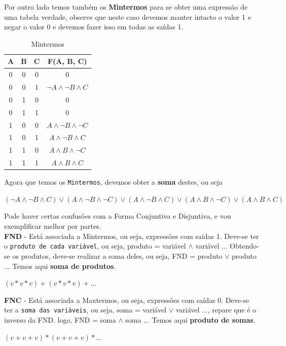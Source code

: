 \documentclass[12pt, onecolumn]{article}
\begin{document}
	Por outro lado temos também os \textbf{Mintermos} para se obter 
	uma expressão de uma tabela verdade, observe que neste caso
	devemos manter intacto o valor 1 e negar o valor 0 e devemos fazer isso
	em todas as saídas 1. \\
        \begin{table}[ht]
                \centering
                \begin{tabular}{|c|c|c|c|}
                        \hline
                        A & B & C & F(A, B, C)\\ \hline

                        0 & 0 & 0 & 0 \\ \hline
			0 & 0 & 1 & $\lnot{A} \land \lnot{B} \land C$ \\ \hline %
                        0 & 1 & 0 & 0 \\ \hline
                        0 & 1 & 1 & 0 \\ \hline
			1 & 0 & 0 & $A \land \lnot{B} \land \lnot{C}$ \\ \hline %
			1 & 0 & 1 & $A \land \lnot{B} \land C$ \\ \hline %
			1 & 1 & 0 & $A \land B \land \lnot{C}$ \\ \hline %
                        1 & 1 & 1 & $A \land B \land C$ \\ \hline %
                \end{tabular} 
		\caption{Mintermos}
        \end{table}
	Agora que temos os \texttt{Mintermos}, devemos obter a \textbf{soma}
	destes, ou seja \\
	\begin{center}
		$  %
		(\lnot{A} \land \lnot{B} \land C) \lor 
		(A \land \lnot{B} \land \lnot{C}) \lor 
		(A \land \lnot{B} \land C) \lor 
		(A \land B \land \lnot{C}) \lor 
		(A \land B \land C) 
		$
	\end{center}
	Pode haver certas confusões com a Forma Conjuntiva e Disjuntiva, 
	e vou exemplificar melhor por partes. \\
	\newline
	\textbf{FND} - Está associada a Mintermos, ou seja, expressões com saídas 1.
	Deve-se ter o \texttt{produto de cada variável}, ou seja, 
	produto =  variável $\land$ variável ...
	Obtendo-se os produtos, deve-se realizar a soma deles, ou seja,
	FND =  produto $\lor$ produto ... Temos aqui \textbf{soma de produtos}. \\
	\begin{center}
		$(v * v * v) + (v * v * v) + ... $
	\end{center}
	\textbf{FNC} - Está associada a Maxtermos, ou seja, expressões com saídas 0.
	Deve-se ter a \texttt{soma das variáveis}, ou seja,
	soma = variável $\lor$ variável ..., repare que é o inverso da FND.
	logo, FND = soma $\land$ soma ... Temos aqui \textbf{produto de somas}. \\
	\begin{center}
		$(v + v + v) * (v + v + v) * ... $
	\end{center}
	
\end{document}
